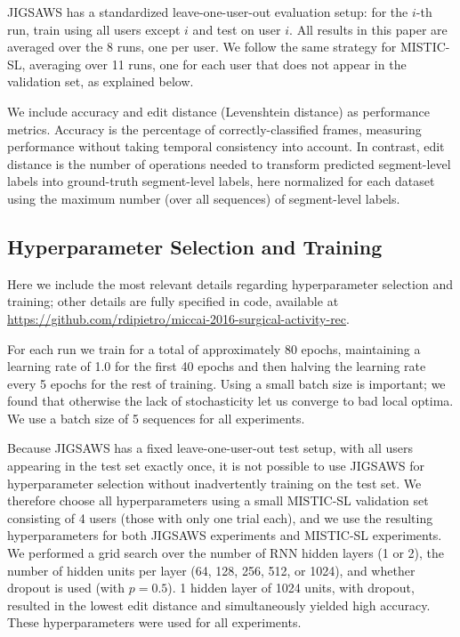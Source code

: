 \documentclass{llncs}
\begin{document}
JIGSAWS has a standardized leave-one-user-out evaluation setup: for the $i$-th run, train using all users except $i$ and test on user $i$. All results in this paper are averaged over the 8 runs, one per user. We follow the same strategy for MISTIC-SL, averaging over 11 runs, one for each user that does not appear in the validation set, as explained below.

We include accuracy and edit distance (Levenshtein distance) as performance metrics. Accuracy is the percentage of correctly-classified frames, measuring performance without taking temporal consistency into account. In contrast, edit distance is the number of operations needed to transform predicted segment-level labels into ground-truth segment-level labels, here normalized for each dataset using the maximum number (over all sequences) of segment-level labels.

\subsection{Hyperparameter Selection and Training}

Here we include the most relevant details regarding hyperparameter selection and training; other details are fully specified in code, available at\\ \url{https://github.com/rdipietro/miccai-2016-surgical-activity-rec}.

For each run we train for a total of approximately 80 epochs, maintaining a learning rate of 1.0 for the first 40 epochs and then halving the learning rate every 5 epochs for the rest of training. Using a small batch size is important; we found that otherwise the lack of stochasticity let us converge to bad local optima. We use a batch size of 5 sequences for all experiments.

Because JIGSAWS has a fixed leave-one-user-out test setup, with all users appearing in the test set exactly once, it is not possible to use JIGSAWS for hyperparameter selection without inadvertently training on the test set. We therefore choose all hyperparameters using a small MISTIC-SL validation set consisting of 4 users (those with only one trial each), and we use the resulting hyperparameters for both JIGSAWS experiments and MISTIC-SL experiments. We performed a grid search over the number of RNN hidden layers (1 or 2), the number of hidden units per layer (64, 128, 256, 512, or 1024), and whether dropout \cite{zaremba2014recurrent} is used (with $p = 0.5$). 1 hidden layer of 1024 units, with dropout, resulted in the lowest edit distance and simultaneously yielded high accuracy. These hyperparameters were used for all experiments.
\end{document}
